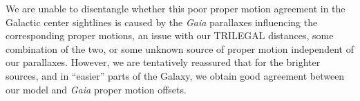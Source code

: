 \documentclass[fleqn,usenatbib]{mnras}
\begin{document}
We are unable to disentangle whether this poor proper motion agreement in the Galactic center sightlines is caused by the \textit{Gaia} parallaxes influencing the corresponding proper motions, an issue with our TRILEGAL distances, some combination of the two, or some unknown source of proper motion independent of our parallaxes.  However, we are tentatively reassured that for the brighter sources, and in ``easier'' parts of the Galaxy, we obtain good agreement between our model and \textit{Gaia} proper motion offsets.







\bsp	%
\label{lastpage}
\end{document}
